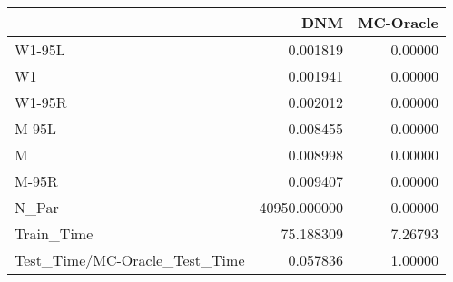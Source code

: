 \begin{tabular}{lrr}
\toprule
{} &           DNM &  MC-Oracle \\
\midrule
W1-95L                        &      0.001819 &    0.00000 \\
W1                            &      0.001941 &    0.00000 \\
W1-95R                        &      0.002012 &    0.00000 \\
M-95L                         &      0.008455 &    0.00000 \\
M                             &      0.008998 &    0.00000 \\
M-95R                         &      0.009407 &    0.00000 \\
N\_Par                         &  40950.000000 &    0.00000 \\
Train\_Time                    &     75.188309 &    7.26793 \\
Test\_Time/MC-Oracle\_Test\_Time &      0.057836 &    1.00000 \\
\bottomrule
\end{tabular}
